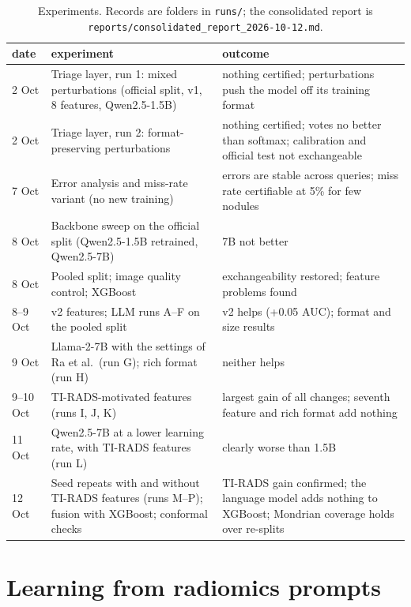 \begin{table}[ht]
  \centering
  \small
  \caption{Experiments. Records are folders in \texttt{runs/}; the consolidated report is
           \texttt{reports/consolidated\_report\_2026-10-12.md}.}
  \label{tab:results-timeline}
  \begin{tabular}{lp{4.3cm}p{6.2cm}}
    \toprule
    date & experiment & outcome \\
    \midrule
    2 Oct  & Triage layer, run 1: mixed perturbations (official split, v1, 8 features, Qwen2.5-1.5B) & nothing certified; perturbations push the model off its training format \\
    2 Oct  & Triage layer, run 2: format-preserving perturbations & nothing certified; votes no better than softmax; calibration and official test not exchangeable \\
    7 Oct  & Error analysis and miss-rate variant (no new training) & errors are stable across queries; miss rate certifiable at 5\% for few nodules \\
    8 Oct  & Backbone sweep on the official split (Qwen2.5-1.5B retrained, Qwen2.5-7B) & 7B not better \\
    8 Oct  & Pooled split; image quality control; XGBoost & exchangeability restored; feature problems found \\
    8--9 Oct & v2 features; LLM runs A--F on the pooled split & v2 helps (+0.05 AUC); format and size results \\
    9 Oct  & Llama-2-7B with the settings of Ra et al.\ (run G); rich format (run H) & neither helps \\
    9--10 Oct & TI-RADS-motivated features (runs I, J, K) & largest gain of all changes; seventh feature and rich format add nothing \\
    11 Oct & Qwen2.5-7B at a lower learning rate, with TI-RADS features (run L) & clearly worse than 1.5B \\
    12 Oct & Seed repeats with and without TI-RADS features (runs M--P); fusion with XGBoost; conformal checks & TI-RADS gain confirmed; the language model adds nothing to XGBoost; Mondrian coverage holds over re-splits \\
    \bottomrule
  \end{tabular}
\end{table}

\section{Learning from radiomics prompts}
\label{sec:results-llm}

